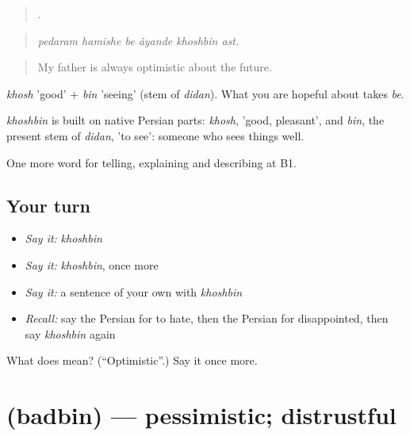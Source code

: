\begin{quote}
     .
\end{quote}

\begin{quote}
\emph{pedaram hamishe be âyande khoshbin ast.}
\end{quote}

\begin{quote}
My father is always optimistic about the future.
\end{quote}

\emph{khosh} 'good' + \emph{bin} 'seeing' (stem of \emph{didan}). What you are hopeful about takes \emph{be}.

\begin{cousinweb}
\emph{khoshbin} is built on native Persian parts: \emph{khosh}, 'good, pleasant', and \emph{bin}, the present stem of \emph{didan}, 'to see': someone who sees things well.
\end{cousinweb}

\begin{grammarlens}[title={What you've built}]
One more word for telling, explaining and describing at B1.
\end{grammarlens}

\subsection*{Your turn}
\begin{itemize}
\raggedright
  \item \emph{Say it:} \emph{khoshbin}
  \item \emph{Say it:} \emph{khoshbin}, once more
  \item \emph{Say it:} a sentence of your own with \emph{khoshbin}
  \item \emph{Recall:} say the Persian for to hate, then the Persian for disappointed, then say \emph{khoshbin} again
\end{itemize}

\begin{tcolorbox}[breakable,colback=teal!4,colframe=teal!35!black,title={Before you move on}]
What does  mean? (\textquotedblleft{}Optimistic\textquotedblright{}.) Say it once more.
\end{tcolorbox}
\section[\texorpdfstring{\fa{بدبین} (badbin)}{بدبین (badbin)}]{ (badbin) — pessimistic; distrustful}

